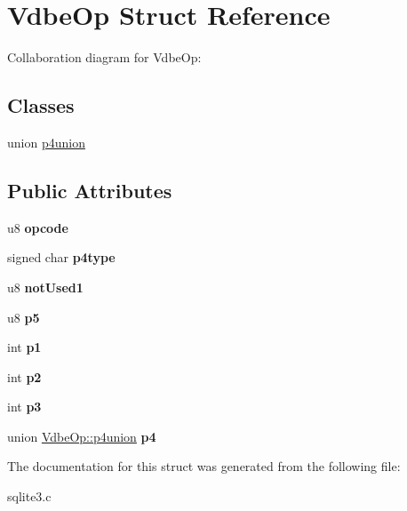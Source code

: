 \hypertarget{structVdbeOp}{}\section{Vdbe\+Op Struct Reference}
\label{structVdbeOp}


Collaboration diagram for Vdbe\+Op\+:
\subsection*{Classes}
\begin{DoxyCompactItemize}
\item 
union \hyperlink{unionVdbeOp_1_1p4union}{p4union}
\end{DoxyCompactItemize}
\subsection*{Public Attributes}
\begin{DoxyCompactItemize}
\item 
u8 {\bfseries opcode}\hypertarget{structVdbeOp_ae12a8e7a8f5f7ba39fa379c9ad287837}{}\label{structVdbeOp_ae12a8e7a8f5f7ba39fa379c9ad287837}

\item 
signed char {\bfseries p4type}\hypertarget{structVdbeOp_a124dee58d3e0d73c7dfaf811a3311023}{}\label{structVdbeOp_a124dee58d3e0d73c7dfaf811a3311023}

\item 
u8 {\bfseries not\+Used1}\hypertarget{structVdbeOp_a15efd0061302e39e9025b5444c8fc5d8}{}\label{structVdbeOp_a15efd0061302e39e9025b5444c8fc5d8}

\item 
u8 {\bfseries p5}\hypertarget{structVdbeOp_a5e807981f52d29c06a5b6d4a8f2f4595}{}\label{structVdbeOp_a5e807981f52d29c06a5b6d4a8f2f4595}

\item 
int {\bfseries p1}\hypertarget{structVdbeOp_a17c8326a1e3ac5612d4aaaa88f383b3b}{}\label{structVdbeOp_a17c8326a1e3ac5612d4aaaa88f383b3b}

\item 
int {\bfseries p2}\hypertarget{structVdbeOp_aba021fa9d30343c16794d9b76d8bffcd}{}\label{structVdbeOp_aba021fa9d30343c16794d9b76d8bffcd}

\item 
int {\bfseries p3}\hypertarget{structVdbeOp_ad7ef3319da20d5423b8cc5da6995d193}{}\label{structVdbeOp_ad7ef3319da20d5423b8cc5da6995d193}

\item 
union \hyperlink{unionVdbeOp_1_1p4union}{Vdbe\+Op\+::p4union} {\bfseries p4}\hypertarget{structVdbeOp_a985bba6c3cd8e093d029e4462f8b4a59}{}\label{structVdbeOp_a985bba6c3cd8e093d029e4462f8b4a59}

\end{DoxyCompactItemize}


The documentation for this struct was generated from the following file\+:\begin{DoxyCompactItemize}
\item 
sqlite3.\+c\end{DoxyCompactItemize}
